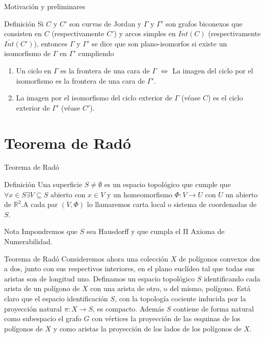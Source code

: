 \documentclass{beamer}
\begin{document}
\begin{frame}{Motivación y preliminares}
    \begin{alertblock}{Definición}
	Si $C$ y $C'$ son curvas de Jordan y $\Gamma$ y $\Gamma'$ son grafos biconexos que consisten en $C$ (respectivamente $C'$) y arcos   simples en $\overline{Int}(C)$ (respectivamente $\overline{Int}(C')$), entonces $\Gamma$ y $\Gamma'$ se dice que son plano-isomorfos si existe un isomorfismo de $\Gamma$ en $\Gamma'$ cumpliendo 
\begin{enumerate}
	\item Un ciclo en $\Gamma$ es la frontera de una cara de $\Gamma$     $\iff$ La imagen del ciclo por el isomorfismo es la frontera de una cara de $\Gamma'$.
	\item La imagen por el isomorfismo del ciclo exterior de $\Gamma$ (véase $C$) es el ciclo exterior de $\Gamma'$ (véase $C'$).
\end{enumerate}
	\end{alertblock}
\end{frame}

\section*{Teorema de Radó}

\begin{frame}{Teorema de Radó}
    \begin{alertblock}{Definición}
    Una superficie $S \neq \emptyset$ es un espacio topológico que cumple que $\forall x \in S \exists V \subseteq S$ abierto con $x \in V$ y un homeomorfismo $\Phi : V \rightarrow U$ con $U$ un abierto de $\mathbb{R}^2$.A cada par $(V,\Phi)$ lo llamaremos carta local o sistema de coordenadas de $S$.
    \end{alertblock}
    \pause
    \begin{block}{Nota}
	Impondremos que $S$ sea Hausdorff y que cumpla el II Axioma de Numerabilidad.
	\end{block}
\end{frame}

\begin{frame}{Teorema de Radó}
    Consideremos ahora una colección $X$ de polígonos convexos dos a dos, junto con sus respectivos interiores, en el plano euclídeo tal que todas sus aristas son de longitud uno. Definamos un espacio topológico $S$ identificando cada arista de un polígono de $X$  con una  arista de otro, o del mismo, polígono. Está claro que el espacio identificación $S$, con la topología cociente inducida por la proyección natural $\pi\colon X\to S$,  es compacto. Además $S$ contiene de forma natural como subespacio el grafo $G$ con  vértices la proyección de las esquinas de los polígonos de $X$ y como aristas la proyección de los lados de los polígonos de $X$.
\end{frame}
\end{document}
